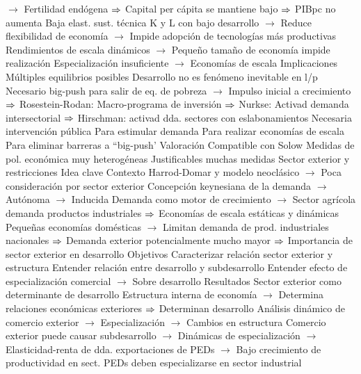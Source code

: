 \documentclass{nuevotema}
\begin{document}
\begin{esquemal}
				\4[] $\to$ Fertilidad endógena
				\4[] $\Rightarrow$ Capital per cápita se mantiene bajo
				\4[] $\Rightarrow$ PIBpc no aumenta
				\4 Baja elast. sust. técnica K y L con bajo desarrollo
				\4[] $\to$ Reduce flexibilidad de economía
				\4[] $\to$ Impide adopción de tecnologías más productivas
				\4 Rendimientos de escala dinámicos
				\4[] $\to$ Pequeño tamaño de economía impide realización
				\4 Especialización insuficiente
				\4[] $\to$ Economías de escala
			\3 Implicaciones
				\4 Múltiples equilibrios posibles
				\4[] Desarrollo no es fenómeno inevitable en l/p
				\4 Necesario big-push para salir de eq. de pobreza
				\4[] $\to$ Impulso inicial a crecimiento
				\4[] $\Rightarrow$ Rosestein-Rodan: Macro-programa de inversión
				\4[] $\Rightarrow$ Nurkse: Activad demanda intersectorial
				\4[] $\Rightarrow$ Hirschman: activad dda. sectores con eslabonamientos
				\4 Necesaria intervención pública
				\4[] Para estimular demanda
				\4[] Para realizar economías de escala
				\4[] Para eliminar barreras a ``big-push'
			\3 Valoración
				\4 Compatible con Solow
				\4 Medidas de pol. económica muy heterogéneas
				\4[] Justificables muchas medidas
		\2 Sector exterior y restricciones
			\3 Idea clave
				\4 Contexto
				\4[] Harrod-Domar y modelo neoclásico
				\4[] $\to$ Poca consideración por sector exterior
				\4[] Concepción keynesiana de la demanda
				\4[] $\to$ Autónoma
				\4[] $\to$ Inducida
				\4[] Demanda como motor de crecimiento
				\4[] $\to$ Sector agrícola demanda productos industriales
				\4[] $\Rightarrow$ Economías de escala estáticas y dinámicas
				\4[] Pequeñas economías domésticas
				\4[] $\to$ Limitan demanda de prod. industriales nacionales
				\4[] $\Rightarrow$ Demanda exterior potencialmente mucho mayor
				\4[] $\Rightarrow$ Importancia de sector exterior en desarrollo
				\4 Objetivos
				\4[] Caracterizar relación sector exterior y estructura
				\4[] Entender relación entre desarrollo y subdesarrollo
				\4[] Entender efecto de especialización comercial
				\4[] $\to$ Sobre desarrollo
				\4 Resultados
				\4[] Sector exterior como determinante de desarrollo
				\4[] Estructura interna de economía
				\4[] $\to$ Determina relaciones económicas exteriores
				\4[] $\Rightarrow$ Determinan desarrollo
				\4[] Análisis dinámico de comercio exterior
				\4[] $\to$ Especialización
				\4[] $\to$ Cambios en estructura
				\4[] Comercio exterior puede causar subdesarrollo
				\4[] $\to$ Dinámicas de especialización
				\4[] $\to$ Elasticidad-renta de dda. exportaciones de PEDs
				\4[] $\to$ Bajo crecimiento de productividad en sect.
				\4[] PEDs deben especializarse en sector industrial

\end{esquemal}
\end{document}
